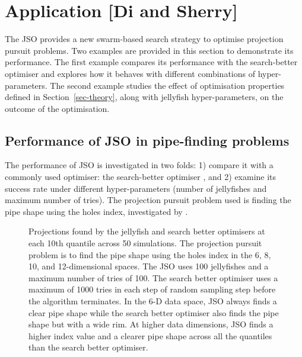 \documentclass[
  number,
  preprint,
  3p]{elsarticle}
\begin{document}
\section{Application {[}Di and Sherry{]}}\label{sec-app}

The JSO provides a new swarm-based search strategy to optimise
projection pursuit problems. Two examples are provided in this section
to demonstrate its performance. The first example compares its
performance with the search-better optimiser and explores how it behaves
with different combinations of hyper-parameters. The second example
studies the effect of optimisation properties defined in
Section~\ref{sec-theory}, along with jellyfish hyper-parameters, on the
outcome of the optimisation.

\subsection{Performance of JSO in pipe-finding
problems}\label{sec-app-1}

The performance of JSO is investigated in two folds: 1) compare it with
a commonly used optimiser: the search-better optimiser
\citep{RJ-2021-105, laa_using_2020}, and 2) examine its success rate
under different hyper-parameters (number of jellyfishes and maximum
number of tries). The projection pursuit problem used is finding the
pipe shape using the holes index, investigated by
\citet{laa_using_2020}.

\begin{figure}


\caption{\label{fig-proj}Projections found by the jellyfish and search
better optimisers at each 10th quantile across 50 simulations. The
projection pursuit problem is to find the pipe shape using the holes
index in the 6, 8, 10, and 12-dimensional spaces. The JSO uses 100
jellyfishes and a maximum number of tries of 100. The search better
optimiser uses a maximum of 1000 tries in each step of random sampling
step before the algorithm terminates. In the 6-D data space, JSO always
finds a clear pipe shape while the search better optimiser also finds
the pipe shape but with a wide rim. At higher data dimensions, JSO finds
a higher index value and a clearer pipe shape across all the quantiles
than the search better optimiser.}

\end{figure}%
\end{document}

